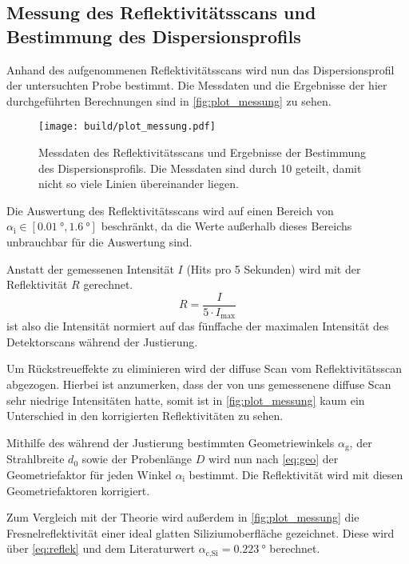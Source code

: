 
\subsection{Messung des Reflektivitätsscans und Bestimmung des Dispersionsprofils}
\label{ssec:Messung}

Anhand des aufgenommenen Reflektivitätsscans wird nun das Dispersionsprofil der untersuchten Probe bestimmt.
Die Messdaten und die Ergebnisse der hier durchgeführten Berechnungen sind in \autoref{fig:plot_messung} zu sehen.

\begin{figure}
    \centering
    \texttt{[image: build/plot\_messung.pdf]}
    \caption{Messdaten des Reflektivitätsscans und Ergebnisse der Bestimmung des Dispersionsprofils. 
    Die Messdaten sind durch 10 geteilt, damit nicht so viele Linien übereinander liegen.} 
    \label{fig:plot_messung}
\end{figure}

Die Auswertung des Reflektivitätsscans wird auf einen Bereich von $\alpha_\text{i} \in [\SI{0.01}{\degree}, \SI{1.6}{\degree}]$ beschränkt,
da die Werte außerhalb dieses Bereichs unbrauchbar für die Auswertung sind.

Anstatt der gemessenen Intensität $I$ (Hits pro 5 Sekunden) wird mit der Reflektivität $R$ gerechnet.
\begin{equation}
    R = \frac{I}{5 \cdot I_\text{max}}
\end{equation}
ist also die Intensität normiert auf das fünffache der maximalen Intensität des Detektorscans während der Justierung.

Um Rückstreueffekte zu eliminieren wird der diffuse Scan vom Reflektivitätsscan abgezogen. 
Hierbei ist anzumerken, dass der von uns gemessenene diffuse Scan sehr niedrige Intensitäten hatte, 
somit ist in \autoref{fig:plot_messung} kaum ein Unterschied in den korrigierten Reflektivitäten zu sehen.

Mithilfe des während der Justierung bestimmten Geometriewinkels $\alpha_\text{g}$, der Strahlbreite $d_0$ sowie der Probenlänge $D$
wird nun nach \autoref{eq:geo} der Geometriefaktor für jeden Winkel $\alpha_\text{i}$ bestimmt.
Die Reflektivität wird mit diesen Geometriefaktoren korrigiert.

Zum Vergleich mit der Theorie wird außerdem in \autoref{fig:plot_messung} die Fresnelreflektivität einer ideal glatten Siliziumoberfläche gezeichnet.
Diese wird über \autoref{eq:reflek} und dem Literaturwert $\alpha_\text{c,Si} = \SI{0.223}{\degree}$ berechnet.\cite{V44old}

